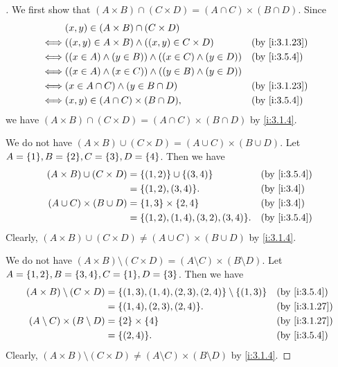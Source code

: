 \begin{proof}[]
  We first show that \((A \times B) \cap (C \times D) = (A \cap C) \times (B \cap D)\).
  Since
  \begin{align*}
         & (x, y) \in (A \times B) \cap (C \times D)                                        \\
    \iff & ((x, y) \in A \times B) \land ((x, y) \in C \times D)         &  & \by{i:3.1.23} \\
    \iff & ((x \in A) \land (y \in B)) \land ((x \in C) \land (y \in D)) &  & \by{i:3.5.4}  \\
    \iff & ((x \in A) \land (x \in C)) \land ((y \in B) \land (y \in D))                    \\
    \iff & (x \in A \cap C) \land (y \in B \cap D)                       &  & \by{i:3.1.23} \\
    \iff & (x, y) \in (A \cap C) \times (B \cap D),                      &  & \by{i:3.5.4}
  \end{align*}
  we have \((A \times B) \cap (C \times D) = (A \cap C) \times (B \cap D)\) by \cref{i:3.1.4}.

  We do not have \((A \times B) \cup (C \times D) = (A \cup C) \times (B \cup D)\).
  Let \(A = \set{1}, B = \set{2}, C = \set{3}, D = \set{4}\).
  Then we have
  \begin{align*}
    (A \times B) \cup (C \times D) & = \set{(1, 2)} \cup \set{(3, 4)}        &  & \by{i:3.5.4} \\
                                   & = \set{(1, 2), (3, 4)}.                 &  & \by{i:3.4}   \\
    (A \cup C) \times (B \cup D)   & = \set{1, 3} \times \set{2, 4}          &  & \by{i:3.4}   \\
                                   & = \set{(1, 2), (1, 4), (3, 2), (3, 4)}. &  & \by{i:3.5.4}
  \end{align*}
  Clearly, \((A \times B) \cup (C \times D) \neq (A \cup C) \times (B \cup D)\) by \cref{i:3.1.4}.

  We do not have \((A \times B) \setminus (C \times D) = (A \setminus C) \times (B \setminus D)\).
  Let \(A = \set{1, 2}, B = \set{3, 4}, C = \set{1}, D = \set{3}\).
  Then we have
  \begin{align*}
    (A \times B) \setminus (C \times D)    & = \set{(1, 3), (1, 4), (2, 3), (2, 4)} \setminus \set{(1, 3)} &  & \by{i:3.5.4}  \\
                                           & = \set{(1, 4), (2, 3), (2, 4)}.                               &  & \by{i:3.1.27} \\
    (A \setminus C) \times (B \setminus D) & = \set{2} \times \set{4}                                      &  & \by{i:3.1.27} \\
                                           & = \set{(2, 4)}.                                               &  & \by{i:3.5.4}
  \end{align*}
  Clearly, \((A \times B) \setminus (C \times D) \neq (A \setminus C) \times (B \setminus D)\) by \cref{i:3.1.4}.
\end{proof}

